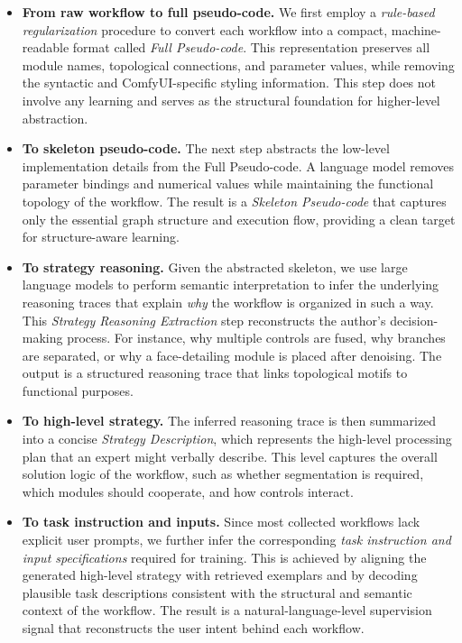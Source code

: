 \documentclass[runningheads]{llncs}
\begin{document}
\begin{itemize}
    \item \textbf{From raw workflow to full pseudo-code.} We first employ a \textit{rule-based regularization} procedure to convert each workflow into a compact, machine-readable format called \textit{Full Pseudo-code}. This representation preserves all module names, topological connections, and parameter values, while removing the syntactic and ComfyUI-specific styling information.  This step does not involve any learning and serves as the structural foundation for higher-level abstraction.
    \item \textbf{To skeleton pseudo-code.} The next step abstracts the low-level implementation details from the Full Pseudo-code. A language model removes parameter bindings and numerical values while maintaining the functional topology of the workflow. The result is a \textit{Skeleton Pseudo-code} that captures only the essential graph structure and execution flow, providing a clean target for structure-aware learning.
    \item \textbf{To strategy reasoning.} Given the abstracted skeleton, we use large language models to perform semantic interpretation to infer the underlying reasoning traces that explain \emph{why} the workflow is organized in such a way. This \textit{Strategy Reasoning Extraction} step reconstructs the author's decision-making process. For instance, why multiple controls are fused, why branches are separated, or why a face-detailing module is placed after denoising. The output is a structured reasoning trace that links topological motifs to functional purposes.
    \item \textbf{To high-level strategy.} The inferred reasoning trace is then summarized into a concise \textit{Strategy Description}, which represents the high-level processing plan that an expert might verbally describe. This level captures the overall solution logic of the workflow, such as whether segmentation is required, which modules should cooperate, and how controls interact.
    \item \textbf{To task instruction and inputs.} Since most collected workflows lack explicit user prompts, we further infer the corresponding \textit{task instruction and input specifications} required for training. This is achieved by aligning the generated high-level strategy with retrieved exemplars and by decoding plausible task descriptions consistent with the structural and semantic context of the workflow. The result is a natural-language-level supervision signal that reconstructs the user intent behind each workflow.
\end{itemize}
\end{document}
